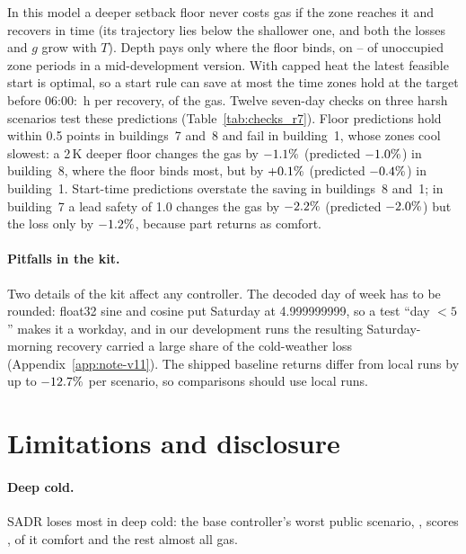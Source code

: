 \documentclass{article}
\begin{document}
In this model a deeper setback floor never costs gas if the zone reaches it and recovers in time (its trajectory lies below the shallower one, and both the losses and $g$ grow with $T$). Depth pays only where the floor binds, on \RSevBindLo--\RSevBindHi{} of unoccupied zone periods in a mid-development version. With capped heat the latest feasible start is optimal, so a start rule can save at most the time zones hold at the target before 06:00: \RSevHoldH\,h per recovery, \RSevHoldGas{} of the gas. Twelve seven-day checks on three harsh scenarios test these predictions (Table~\ref{tab:checks_r7}). Floor predictions hold within 0.5 points in buildings~7 and~8 and fail in building~1, whose zones cool slowest: a 2\,K deeper floor changes the gas by $-1.1\%$ (predicted $-1.0\%$) in building~8, where the floor binds most, but by $+0.1\%$ (predicted $-0.4\%$) in building~1. Start-time predictions overstate the saving in buildings~8 and~1; in building~7 a lead safety of 1.0 changes the gas by $-2.2\%$ (predicted $-2.0\%$) but the loss only by $-1.2\%$, because part returns as comfort.

\paragraph{Pitfalls in the kit.} Two details of the kit affect any controller. The decoded day of week has to be rounded: float32 sine and cosine put Saturday at 4.999999999, so a test ``day $<5$'' makes it a workday, and in our development runs the resulting Saturday-morning recovery carried a large share of the cold-weather loss (Appendix~\ref{app:note-v11}). The shipped baseline returns differ from local runs by up to $-12.7\%$ per scenario, so comparisons should use local runs.

\section{Limitations and disclosure}
\label{sec:limits}
\paragraph{Deep cold.} SADR loses most in deep cold: the base controller's worst public scenario, \RElvWorstPubScen, scores \RElvWorstPub, \RElvWorstPubComfortShare{} of it comfort and the rest almost all gas.
\end{document}

